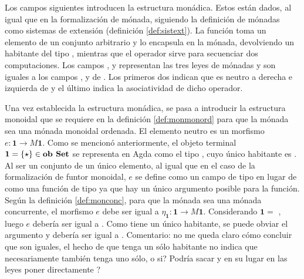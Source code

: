 Los campos siguientes introducen la estructura monádica. Estos están dados, al igual que en la formalización de mónada, siguiendo la definición de mónadas como sistemas de extensión (definición \ref{def:sistext}). La función  toma un elemento de un conjunto  arbitrario y lo encapsula en la mónada, devolviendo un habitante del tipo , mientras que el operador \AgdaField{$\gg=$} sirve para secuenciar dos computaciones. Los campos ,  y  representan las tres leyes de mónadas y son iguales a los campos ,  y  de . Los primeros dos indican que  es neutro a derecha e izquierda de \AgdaField{$\gg=$} y el último indica la asociatividad de dicho operador.

Una vez establecida la estructura monádica, se pasa a introducir la estructura monoidal que se requiere en la definición \ref{def:monmonord} para que la mónada sea una mónada monoidal ordenada. El elemento neutro es un morfismo $e : \mathbf{1} \rightarrow \mathit{M} \mathbf{1}$. Como se mencionó anteriormente, el objeto terminal $\mathbf{1} = \{\star\} \in \text{\bf ob Set}$ se representa en Agda como el tipo \AgdaDatatype{$\top$}, cuyo único habitante es . Al ser un conjunto de un único elemento, al igual que en el caso de la formalización de funtor monoidal, $e$ se define como un campo  de tipo  \AgdaDatatype{$\top$} en lugar de como una función de tipo \AgdaDatatype{$\top$} \AgdaSymbol{$\rightarrow$}  \AgdaDatatype{$\top$} ya que hay un único argumento posible para la función. Según la definición \ref{def:monconc}, para que la mónada sea una mónada concurrente, el morfismo $e$ debe ser igual a $\eta_{\mathbf{1}} : \mathbf{1} \rightarrow \mathit{M} \mathbf{1}$. Considerando $\mathbf{1} =$ \AgdaDatatype{$\top$}, luego $e$ debería ser igual a  \AgdaSymbol{\{}\AgdaDatatype{$\top$}\AgdaSymbol{\} :} \AgdaDatatype{$\top$} \AgdaSymbol{$\rightarrow$}  \AgdaDatatype{$\top$}. Como \AgdaDatatype{$\top$} tiene un único habitante, se puede obviar el argumento y  debería ser igual a   \AgdaSymbol{:}  \AgdaDatatype{$\top$}. {\color{red} Comentario: no me queda claro cómo concluir que son iguales, el hecho de que \AgdaDatatype{$\top$} tenga un sólo habitante no indica que  \AgdaDatatype{$\top$} necesariamente también tenga uno sólo, o si? Podría sacar  y en su lugar en las leyes poner directamente  ?}

